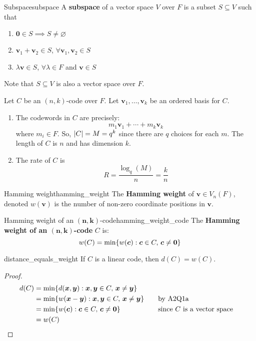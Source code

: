 \begin{Definition}{Subspace}{subspace}
    A \textbf{subspace} of a vector space $ V $ over $ F $ is a subset
    $ S\subseteq V $ such that
    \begin{enumerate}[label=V\arabic*]
        \item $ \bm{0}\in S \implies S\neq \varnothing $
        \item $ \bm{v}_1+\bm{v}_2\in S $, $ \forall \bm{v}_1,\bm{v}_2\in S $
        \item $ \lambda \bm{v}\in S $, $ \forall \lambda\in F $ and $ \bm{v}\in S $
    \end{enumerate}
    Note that $ S\subseteq V $ is also a vector space over $ F $.
\end{Definition}

Let $ C $ be an $ (n,k) $-code over $ F $. Let $ \bm{v}_1,\ldots,\bm{v}_k $ be
an ordered basis for $ C $.
\begin{enumerate}[label=(\arabic*)]
    \item The codewords in $ C $ are precisely:
          \[ m_1\bm{v}_1+\cdots +m_k\bm{v}_k \]
          where $ m_i\in F $. So, $ \lvert C\rvert=M=q^k $ since there are $ q $ choices for each $ m $.
          The length of $ C $ is $ n $ and has dimension $ k $.
    \item The rate of $ C $ is
          \[ R=\frac{\log_q(M)}{n} =\frac{k}{n} \]
\end{enumerate}

\begin{Definition}{Hamming weight}{hamming_weight}
    The \textbf{Hamming weight} of $ \bm{v}\in V_n(F) $, denoted
    $ w(\bm{v}) $ is the number of non-zero coordinate positions in $ \bm{v} $.
\end{Definition}

\begin{Definition}{Hamming weight of an $ \bm{(n,k)} $-code}{hamming_weight_code}
    The \textbf{Hamming weight of an $ \bm{(n,k)} $-code} $ C $ is:
    \[ w(C)=\min \{w(\bm{c}):\bm{c}\in C,\,\bm{c}\neq \bm{0}\} \]
\end{Definition}

\begin{Theorem}{}{distance_equals_weight}
    If $ C $ is a linear code, then $ d(C)=w(C) $.
\end{Theorem}

\begin{proof}
    \begin{align*}
        d(C) & =\min \{d(\bm{x},\bm{y}):\bm{x},\bm{y}\in C,\,\bm{x}\neq \bm{y}\}                                              \\
             & =\min \{w(\bm{x}-\bm{y}):\bm{x},\bm{y}\in C,\,\bm{x}\neq \bm{y}\} & \quad & \text{by A2Q1a}                    \\
             & =\min \{w(\bm{c}):\bm{c}\in C,\,\bm{c}\neq \bm{0}\}               &       & \text{since $C$ is a vector space} \\
             & =w(C)
    \end{align*}
\end{proof}

